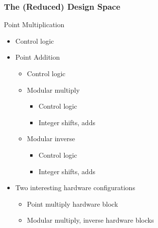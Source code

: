 \documentclass{beamer}
\begin{document}
\begin{frame}
  \frametitle{The (Reduced) Design Space}

  \begin{multicols}{2}
    \begin{minipage}{\linewidth}
      Point Multiplication
      \begin{itemize}
      \item Control logic
      \item Point Addition
        \begin{itemize}
        \item Control logic
        \item Modular multiply
          \begin{itemize}
          \item Control logic
          \item Integer shifts, adds
          \end{itemize}
        \item Modular inverse
          \begin{itemize}
          \item Control logic
          \item Integer shifts, adds
          \end{itemize}
        \end{itemize}
      \end{itemize}
    \end{minipage}

    \begin{minipage}{\linewidth}
      \begin{itemize}
      \item Two interesting hardware configurations
        \begin{itemize}
        \item Point multiply hardware block
        \item Modular multiply, inverse hardware blocks
        \end{itemize}
      \end{itemize}
    \end{minipage}
  \end{multicols}
\end{frame}
\end{document}
